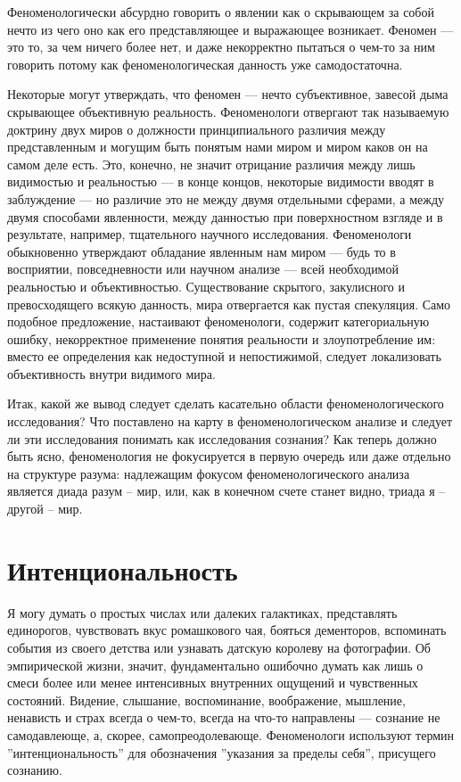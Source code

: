 \documentclass[11pt]{book}
\begin{document}
\smallskip
{}\relax
{}\relax

Феноменологически абсурдно говорить о явлении как о скрывающем за собой нечто из чего оно как его представляющее и выражающее возникает. Феномен --- это то, за чем ничего более нет, и даже некорректно пытаться о чем-то за ним говорить потому как феноменологическая данность уже самодостаточна.

\relax
{}\relax
\smallskip

Некоторые могут утверждать, что феномен --- нечто субъективное, завесой дыма скрывающее объективную реальность. Феноменологи отвергают так называемую доктрину двух миров о должности принципиального различия между представленным и могущим быть понятым нами миром и миром каков он на самом деле есть. Это, конечно, не значит отрицание различия между лишь видимостью и реальностью --- в конце концов, некоторые видимости вводят в заблуждение --- но различие это не между двумя отдельными сферами, а между двумя способами явленности, между данностью при поверхностном взгляде и в результате, например, тщательного научного исследования. Феноменологи обыкновенно утверждают обладание явленным нам миром --- будь то в восприятии, повседневности или научном анализе --- всей необходимой реальностью и объективностью. Существование скрытого, закулисного и превосходящего всякую данность, мира отвергается как пустая спекуляция. Само подобное предложение, настаивают феноменологи, содержит категориальную ошибку, некорректное применение понятия реальности и злоупотребление им: вместо ее определения как недоступной и непостижимой, следует локализовать объективность внутри видимого мира.

Итак, какой же вывод следует сделать касательно области феноменологического исследования? Что поставлено на карту в феноменологическом анализе и следует ли эти исследования понимать как исследования сознания? Как теперь должно быть ясно, феноменология не фокусируется в первую очередь или даже отдельно на структуре разума: надлежащим фокусом феноменологического анализа является диада разум -- мир, или, как в конечном счете станет видно, триада я -- другой -- мир.

\chapter{Интенциональность}

Я могу думать о простых числах или далеких галактиках, представлять единорогов, чувствовать вкус ромашкового чая, бояться дементоров, вспоминать события из своего детства или узнавать датскую королеву на фотографии. Об эмпирической жизни, значит, фундаментально ошибочно думать как лишь о смеси более или менее интенсивных внутренних ощущений и чувственных состояний. Видение, слышание, воспоминание, воображение, мышление, ненависть и страх всегда о чем-то, всегда на что-то направлены --- сознание не самодавлеюще, а, скорее, самопреодолевающе. Феноменологи используют термин ''интенциональность'' для обозначения ''указания за пределы себя'', присущего сознанию.
\end{document}

